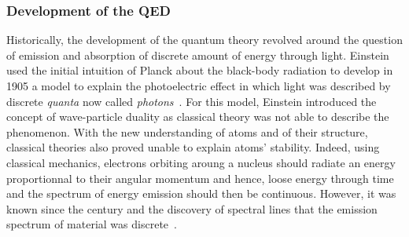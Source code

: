 	\subsubsection*{Development of the \acl{QED}}
	\label{chapt2:sssec:QED}
	
	Historically, the development of the quantum theory revolved around the question of emission and absorption of discrete amount of energy through light. Einstein used the initial intuition of Planck about the black-body radiation to develop in 1905 a model to explain the photoelectric effect in which light was described by discrete \textit{quanta} now called \textit{photons}~\cite{PLANK1900,EINSTEIN1905PHOTO}. For this model, Einstein introduced the concept of wave-particle duality as classical theory was not able to describe the phenomenon. With the new understanding of atoms and of their structure, classical theories also proved unable to explain atoms' stability. Indeed, using classical mechanics, electrons orbiting aroung a nucleus should radiate an energy proportionnal to their angular momentum and hence, loose energy through time and the spectrum of energy emission should then be continuous. However, it was known since the  century and the discovery of spectral lines that the emission spectrum of material was discrete~\cite{FRAUNHOFER1814}.
	

